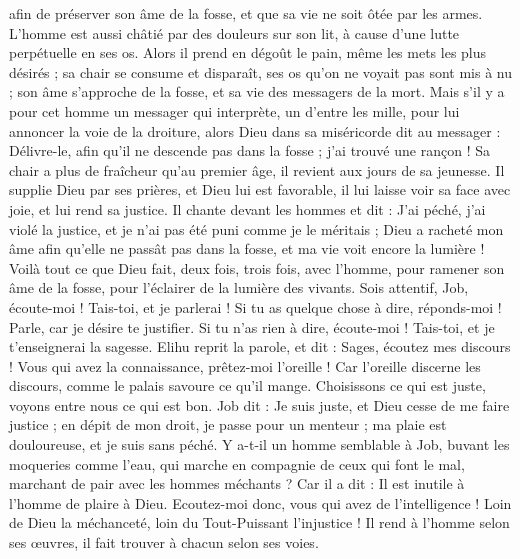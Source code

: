 \begin{multicols}{2}
afin de préserver son âme de la fosse, et que sa vie ne soit ôtée par les armes.
L'homme est aussi châtié par des douleurs sur son lit, à cause d'une lutte perpétuelle en ses os.
Alors il prend en dégoût le pain, même les mets les plus désirés ;
sa chair se consume et disparaît, ses os qu'on ne voyait pas sont mis à nu ;
son âme s'approche de la fosse, et sa vie des messagers de la mort.
Mais s'il y a pour cet homme un messager qui interprète, un d'entre les mille, pour lui annoncer la voie de la droiture,
alors Dieu dans sa miséricorde dit au messager : Délivre-le, afin qu'il ne descende pas dans la fosse ; j'ai trouvé une rançon !
Sa chair a plus de fraîcheur qu'au premier âge, il revient aux jours de sa jeunesse.
Il supplie Dieu par ses prières, et Dieu lui est favorable, il lui laisse voir sa face avec joie, et lui rend sa justice.
Il chante devant les hommes et dit : J'ai péché, j'ai violé la justice, et je n'ai pas été puni comme je le méritais ;
Dieu a racheté mon âme afin qu'elle ne passât pas dans la fosse, et ma vie voit encore la lumière !
Voilà tout ce que Dieu fait, deux fois, trois fois, avec l'homme,
pour ramener son âme de la fosse, pour l'éclairer de la lumière des vivants.
Sois attentif, Job, écoute-moi ! Tais-toi, et je parlerai !
Si tu as quelque chose à dire, réponds-moi ! Parle, car je désire te justifier.
Si tu n'as rien à dire, écoute-moi ! Tais-toi, et je t'enseignerai la sagesse.
\VerseOne{}Elihu reprit la parole, et dit :
Sages, écoutez mes discours ! Vous qui avez la connaissance, prêtez-moi l'oreille !
Car l'oreille discerne les discours, comme le palais savoure ce qu'il mange.
Choisissons ce qui est juste, voyons entre nous ce qui est bon.
Job dit : Je suis juste, et Dieu cesse de me faire justice ;
en dépit de mon droit, je passe pour un menteur ; ma plaie est douloureuse, et je suis sans péché.
Y a-t-il un homme semblable à Job, buvant les moqueries comme l'eau,
qui marche en compagnie de ceux qui font le mal, marchant de pair avec les hommes méchants ?
Car il a dit : Il est inutile à l'homme de plaire à Dieu.
Ecoutez-moi donc, vous qui avez de l'intelligence ! Loin de Dieu la méchanceté, loin du Tout-Puissant l'injustice !
Il rend à l'homme selon ses œuvres, il fait trouver à chacun selon ses voies.

\end{multicols}
